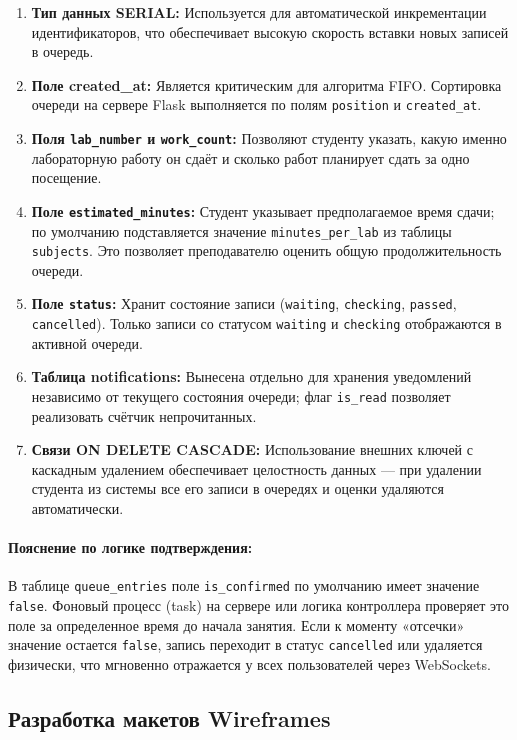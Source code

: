 \begin{enumerate}
    \item \textbf{Тип данных SERIAL:} Используется для автоматической инкрементации идентификаторов,
 что обеспечивает высокую скорость вставки новых записей в очередь.
    \item \textbf{Поле created\_at:} Является критическим для алгоритма FIFO. Сортировка очереди на сервере
 Flask выполняется по полям \texttt{position} и \texttt{created\_at}.
    \item \textbf{Поля \texttt{lab\_number} и \texttt{work\_count}:} Позволяют студенту указать,
 какую именно лабораторную работу он сдаёт и сколько работ планирует сдать за одно посещение.
    \item \textbf{Поле \texttt{estimated\_minutes}:} Студент указывает предполагаемое время сдачи;
 по умолчанию подставляется значение \texttt{minutes\_per\_lab} из таблицы \texttt{subjects}.
 Это позволяет преподавателю оценить общую продолжительность очереди.
    \item \textbf{Поле \texttt{status}:} Хранит состояние записи (\texttt{waiting}, \texttt{checking},
 \texttt{passed}, \texttt{cancelled}). Только записи со статусом \texttt{waiting} и \texttt{checking}
 отображаются в активной очереди.
    \item \textbf{Таблица notifications:} Вынесена отдельно для хранения уведомлений независимо
 от текущего состояния очереди; флаг \texttt{is\_read} позволяет реализовать счётчик непрочитанных.
    \item \textbf{Связи ON DELETE CASCADE:} Использование внешних ключей с каскадным удалением обеспечивает
 целостность данных — при удалении студента из системы все его записи в очередях и оценки удаляются автоматически.
\end{enumerate}

\paragraph{Пояснение по логике подтверждения:}
В таблице \texttt{queue\_entries} поле \texttt{is\_confirmed} по умолчанию имеет значение \texttt{false}. 
Фоновый процесс (task) на сервере или логика контроллера проверяет это поле за определенное время до начала
 занятия. Если к моменту «отсечки» значение остается \texttt{false}, запись переходит в статус 
 \texttt{cancelled} или удаляется физически, что мгновенно отражается у всех пользователей через WebSockets.


\subsection{Разработка макетов Wireframes}

